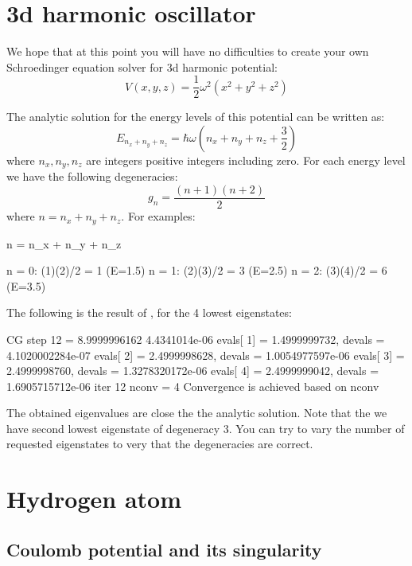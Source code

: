\section{3d harmonic oscillator}

We hope that at this point you will have no difficulties to create your own
Schroedinger equation solver for 3d harmonic potential:
\begin{equation}
V(x,y,z) = \frac{1}{2}\omega^2 \left( x^2 + y^2 + z^2 \right)
\end{equation}

The analytic solution for the energy levels of this potential can be written as:
\begin{equation}
E_{n_{x} + n_{y} + n_{z}} = \hbar \omega \left( n_{x} + n_{y} + n_{z} + \frac{3}{2} \right)
\end{equation}
where $n_x, n_y, n_z$ are integers positive integers including zero.
%
For each energy level we have the following degeneracies:
\begin{equation}
g_{n} = \frac{(n + 1)(n + 2)}{2}
\end{equation}
where $n = n_x + n_y + n_z$.
%
For examples:
\begin{textcode}
n = n_x + n_y + n_z

n = 0: (1)(2)/2 = 1  (E=1.5)
n = 1: (2)(3)/2 = 3  (E=2.5)
n = 2: (3)(4)/2 = 6  (E=3.5)
\end{textcode}

The following is the result of , for the 4 lowest eigenstates:
\begin{textcode}
CG step       12 =       8.9999996162 4.4341014e-06
evals[  1] =       1.4999999732, devals =   4.1020002284e-07
evals[  2] =       2.4999998628, devals =   1.0054977597e-06
evals[  3] =       2.4999998760, devals =   1.3278320172e-06
evals[  4] =       2.4999999042, devals =   1.6905715712e-06
iter 12 nconv = 4
Convergence is achieved based on nconv    
\end{textcode}
%
The obtained eigenvalues are close the the analytic solution.
Note that the we have second lowest eigenstate of degeneracy 3.
You can try to vary the number of requested eigenstates to very that the degeneracies are
correct.


\section{Hydrogen atom}

\subsection{Coulomb potential and its singularity}

